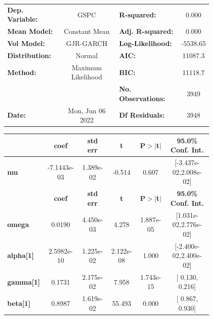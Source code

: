\documentclass[a4paper, oneside]{discothesis}
\begin{document}
\begin{figure}
\begin{multicols}{2}
{  
\begin{center}
\begin{tabular}{lclc}
\toprule
\textbf{Dep. Variable:} &        GSPC        & \textbf{  R-squared:         } &     0.000   \\
\textbf{Mean Model:}    &   Constant Mean    & \textbf{  Adj. R-squared:    } &     0.000   \\
\textbf{Vol Model:}     &     GJR-GARCH      & \textbf{  Log-Likelihood:    } &   -5538.65  \\
\textbf{Distribution:}  &       Normal       & \textbf{  AIC:               } &    11087.3  \\
\textbf{Method:}        & Maximum Likelihood & \textbf{  BIC:               } &    11118.7  \\
\textbf{}               &                    & \textbf{  No. Observations:  } &    3949     \\
\textbf{Date:}          &  Mon, Jun 06 2022  & \textbf{  Df Residuals:      } &    3948     \\
\bottomrule
\end{tabular}
\begin{tabular}{lccccc}
            & \textbf{coef} & \textbf{std err} & \textbf{t} & \textbf{P$> |$t$|$} & \textbf{95.0\% Conf. Int.}  \\
\midrule
\textbf{mu} &  -7.1443e-03  &    1.389e-02     &    -0.514  &          0.607       &   [-3.437e-02,2.008e-02]    \\
                  & \textbf{coef} & \textbf{std err} & \textbf{t} & \textbf{P$> |$t$|$} & \textbf{95.0\% Conf. Int.}  \\
\midrule
\textbf{omega}    &       0.0190  &    4.450e-03     &     4.278  &      1.887e-05       &   [1.031e-02,2.776e-02]     \\
\textbf{alpha[1]} &   2.5982e-10  &    1.225e-02     & 2.122e-08  &          1.000       &   [-2.400e-02,2.400e-02]    \\
\textbf{gamma[1]} &       0.1731  &    2.175e-02     &     7.958  &      1.743e-15       &     [  0.130,  0.216]       \\
\textbf{beta[1]}  &       0.8987  &    1.619e-02     &    55.493  &        0.000         &     [  0.867,  0.930]       \\
\bottomrule
\end{tabular}
\end{center}

}
\end{multicols}
\end{figure}
\end{document}

